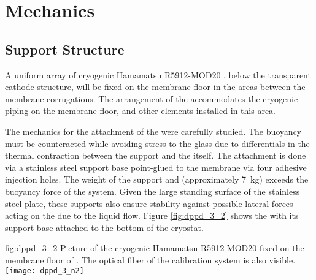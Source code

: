 \section{Mechanics}
\label{sec:dp-pds-mechanics}

\subsection{ Support Structure}
\label{subsec:dp-pds-mechanics-pmtsupport}

A uniform array of \dpnumpmtch cryogenic Hamamatsu R5912-MOD20 , below the transparent cathode structure, will be fixed on the membrane floor in the areas between the membrane corrugations. The arrangement of the  accommodates the cryogenic piping on the membrane floor, and other elements installed in this area.

The mechanics for the attachment of the  were carefully studied. The  buoyancy must be counteracted while avoiding stress to the  glass due to differentials in the thermal contraction between the support and the  itself. The attachment is done via a stainless steel support base point-glued to the membrane via four adhesive injection holes. The weight of the support and  (approximately \SI{7}{\kg}) exceeds the buoyancy force of the system. Given the large standing surface of the stainless steel plate, these supports also ensure stability against possible lateral forces acting on the  due to the liquid flow. Figure \ref{fig:dppd_3_2} shows the  with its support base attached to the bottom of the  cryostat.


\begin{dunefigure}{fig:dppd_3_2}
{Picture of the cryogenic Hamamatsu R5912-MOD20  fixed on the membrane floor of . The optical fiber of the calibration system is also visible.}
\texttt{[image: dppd\_3\_n2]}
\end{dunefigure}


